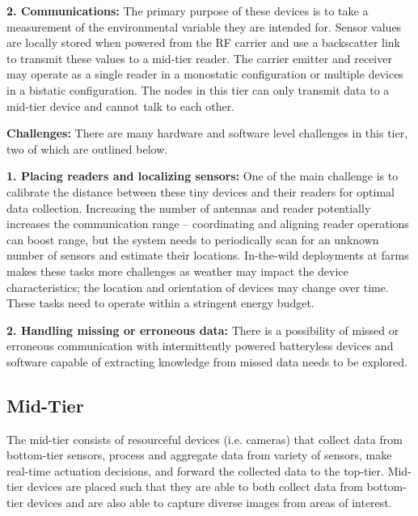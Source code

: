 \noindent\textbf{2. Communications:} 
The primary purpose of these devices is to take a measurement of the environmental variable they are intended for. Sensor values are locally stored when powered from the RF carrier and use a backscatter link to transmit these values to a mid-tier reader. The carrier emitter and receiver may operate as a single reader in a monostatic configuration or multiple devices in a bistatic configuration. The nodes in this tier can only transmit data to a mid-tier device and cannot talk to each other. %

\noindent\textbf{Challenges:} There are many hardware and software level challenges in this tier, two of which are outlined below. 

\noindent\textbf{1. Placing readers and localizing sensors:}
One of the main challenge is to calibrate the distance between these tiny devices and their readers for optimal data collection. Increasing the number of antennas and reader potentially increases the communication range -- coordinating and aligning reader operations can boost range, but the system needs to periodically scan for an unknown number of sensors and estimate their locations. In-the-wild deployments at farms makes these tasks more challenges as weather may impact the device characteristics; the location and orientation of devices may change over time. These tasks need to operate within a stringent energy budget.

\noindent\textbf{2. Handling missing or erroneous data:}
 There is a possibility of missed or erroneous communication with intermittently powered batteryless devices and software capable of extracting knowledge from missed data needs to be explored. 


\subsection{Mid-Tier} 
The mid-tier consists of resourceful devices (i.e. cameras) that collect data from bottom-tier sensors, process and aggregate data from variety of sensors, make real-time actuation decisions, and forward the collected data to the top-tier. Mid-tier devices are placed such that they are able to both collect data from bottom-tier devices and are also able to capture diverse images from areas of interest.

